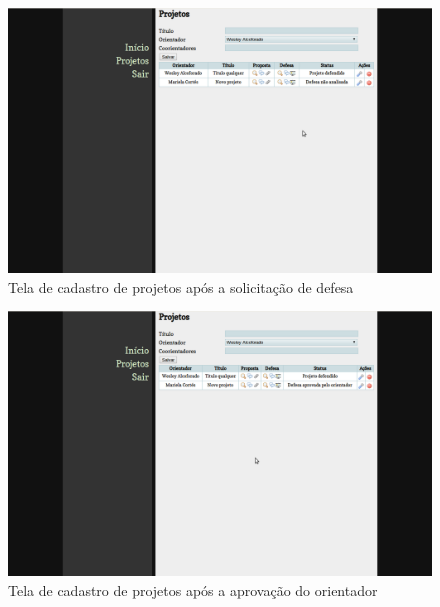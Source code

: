 \begin{figure}[htbp]
\centering
\includegraphics[width=1\textwidth]{fig/telas/processo/aluno_08_defesa_nao_analisada.png}
\caption{Tela de cadastro de projetos após a solicitação de defesa}
\label{fig:aluno_08_defesa_nao_analisada}
\end{figure}

\begin{figure}[htbp]
\centering
\includegraphics[width=1\textwidth]{fig/telas/processo/aluno_09_defesa_analisada_professor.png}
\caption{Tela de cadastro de projetos após a aprovação do orientador}
\label{fig:aluno_09_defesa_analisada_professor}
\end{figure}

